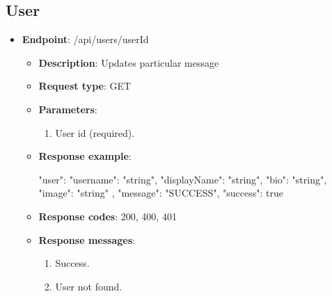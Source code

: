 \subsection{User}\label{subsec:user}
\begin{itemize}
    \item \textbf{Endpoint}: /api/users/{userId}
    \begin{itemize}

        \item \textbf{Description}: Updates particular message

        \item \textbf{Request type}: GET

        \item \textbf{Parameters}:

        \begin{enumerate}
            \item User id (required).
        \end{enumerate}

        \item \textbf{Response example}:

        \begin{spverbatim}
        {
            "user": {
            "username": "string",
            "displayName": "string",
            "bio": "string",
            "image": "string"
        },
            "message": "SUCCESS",
            "success": true
        }
        \end{spverbatim}

        \item \textbf{Response codes}: 200, 400, 401

        \item \textbf{Response messages}:
        \begin{enumerate}
            \item Success.
            \item User not found.
        \end{enumerate}
    \end{itemize}
\end{itemize}